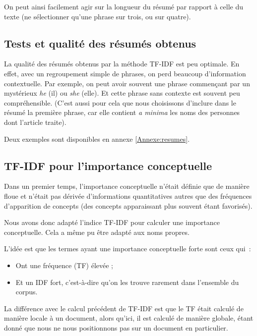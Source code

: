 \documentclass[a4paper, 12pt]{article}
\begin{document}
On peut ainsi facilement agir sur la longueur du résumé par rapport à celle du texte (ne sélectionner qu'une phrase sur trois, ou sur quatre).

\subsection{Tests et qualité des résumés obtenus}

La qualité des résumés obtenus par la méthode TF-IDF est peu optimale. En effet, avec un regroupement simple de phrases, on perd beaucoup d'information contextuelle. Par exemple, on peut avoir souvent une phrase commençant par un mystérieux \textit{he} (il) ou \textit{she} (elle). Et cette phrase sans contexte est souvent peu compréhensible. (C'est aussi pour cela que nous choisissons d'inclure dans le résumé la première phrase, car elle contient \textit{a minima} les noms des personnes dont l'article traite).

Deux exemples sont disponibles en annexe \ref{Annexe:resumes}.


\subsection{TF-IDF pour l'importance conceptuelle}

Dans un premier temps, l'importance conceptuelle n'était définie que de manière floue et n'était pas dérivée d'informations quantitatives autres que des fréquences d'apparition de concepts (des concepts apparaissant plus souvent étant favorisés).

Nous avons donc adapté l'indice TF-IDF pour calculer une importance conceptuelle. Cela a même pu être adapté aux noms propres.

L'idée est que les termes ayant une importance conceptuelle forte sont ceux qui~:
\begin{itemize}
 \item Ont une fréquence (TF) élevée ;
 \item Et un IDF fort, c'est-à-dire qu'on les trouve rarement dans l'ensemble du corpus.
\end{itemize}

La différence avec le calcul précédent de TF-IDF est que le TF était calculé de manière locale à un document, alors qu'ici, il est calculé de manière globale, étant donné que nous ne nous positionnons pas sur un document en particulier.
\end{document}
